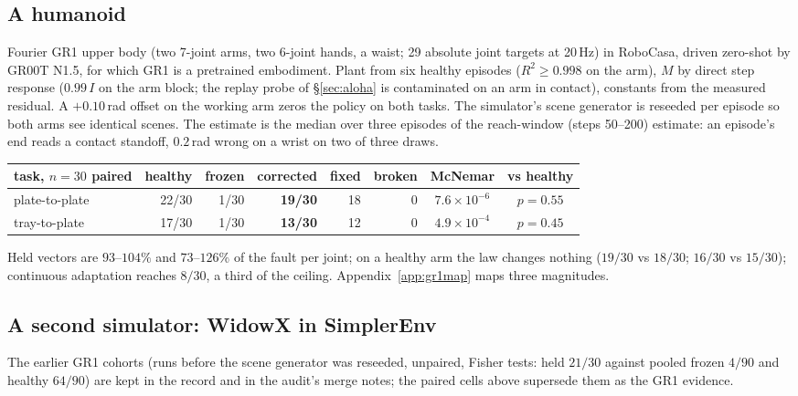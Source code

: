 \documentclass{article}
\begin{document}
\subsection{A humanoid}
\label{sec:gr1}
Fourier GR1 upper body (two 7-joint arms, two 6-joint hands, a waist; 29 absolute joint
targets at 20\,Hz) in RoboCasa, driven zero-shot by GR00T N1.5, for which GR1 is a
pretrained embodiment. Plant from six healthy
episodes ($R^2\ge0.998$ on the arm), $M$ by direct step response ($0.99\,I$ on the arm
block; the replay probe of \S\ref{sec:aloha} is contaminated on an arm in contact),
constants from the measured residual. A $+0.10$\,rad offset on the working arm zeros the
policy on both tasks. The simulator's scene generator is reseeded per episode so both arms
see identical scenes. The estimate is the median over three episodes of the reach-window
(steps 50--200) estimate: an episode's end reads a contact standoff, $0.2$\,rad wrong on a
wrist on two of three draws.

\begin{center}\small
\begin{tabular}{lrrrrrcc}
\toprule
task, $n=30$ paired & healthy & frozen & corrected & fixed & broken & McNemar & vs healthy \\
\midrule
plate-to-plate & 22/30 & 1/30 & \textbf{19/30} & 18 & 0 & $7.6\times10^{-6}$ & $p=0.55$ \\
tray-to-plate & 17/30 & 1/30 & \textbf{13/30} & 12 & 0 & $4.9\times10^{-4}$ & $p=0.45$ \\
\bottomrule
\end{tabular}
\end{center}

Held vectors are $93$--$104\%$ and $73$--$126\%$ of the fault per joint; on a healthy arm
the law changes nothing ($19/30$ vs $18/30$; $16/30$ vs $15/30$); continuous adaptation
reaches $8/30$, a third of the ceiling. Appendix~\ref{app:gr1map} maps three magnitudes.

\subsection{A second simulator: WidowX in SimplerEnv}

The earlier GR1 cohorts (runs before the scene generator was reseeded, unpaired, Fisher
tests: held $21/30$ against pooled frozen $4/90$ and healthy $64/90$) are kept in the record
and in the audit's merge notes; the paired cells above supersede them as the GR1 evidence.
\end{document}
